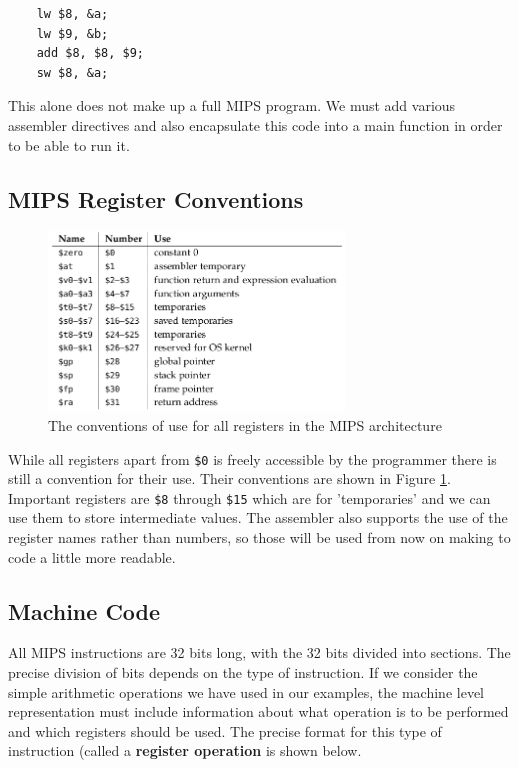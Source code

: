 \documentclass{article}
\begin{document}
	\begin{verbatim}
	lw $8, &a;
	lw $9, &b;
	add $8, $8, $9;
	sw $8, &a;
	\end{verbatim}
	
	This alone does not make up a full MIPS program. We must add various assembler directives and also encapsulate this code into a main function in order to be able to run it.	
		
	\subsection{MIPS Register Conventions}
	
	\begin{figure}[h]
		\centering
		\includegraphics[width=0.7\textwidth]{mips_register_conventions}
		\caption{The conventions of use for all registers in the MIPS architecture}
		\label{fig:mips register conventions}
	\end{figure}
	
	While all registers apart from \texttt{\$0} is freely accessible by the programmer there is still a convention for their use. Their conventions are shown in Figure \ref{fig:mips register conventions}. Important registers are \texttt{\$8} through \texttt{\$15} which are for 'temporaries' and we can use them to store intermediate values. The assembler also supports the use of the register names rather than numbers, so those will be used from now on making to code a little more readable.
	
	
	
	\subsection{Machine Code}
	All MIPS instructions are 32 bits long, with the 32 bits divided into sections. The precise division of bits depends on the type of instruction. If we consider the simple arithmetic operations we have used in our examples, the machine level representation must include information about what operation is to be performed and which registers should be used. The precise format for this type of instruction (called a \textbf{register operation} is shown below.
	
\end{document}
